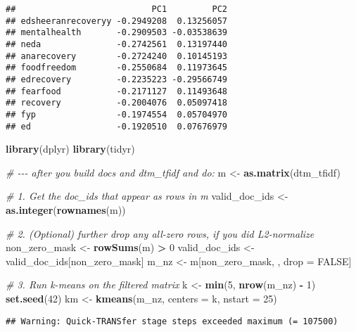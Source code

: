 \documentclass[
]{article}
\newenvironment{Shaded}{\begin{snugshade}}{\end{snugshade}}
\newcommand{\AttributeTok}[1]{\textcolor[rgb]{0.13,0.29,0.53}{#1}}
\newcommand{\CommentTok}[1]{\textcolor[rgb]{0.56,0.35,0.01}{\textit{#1}}}
\newcommand{\ConstantTok}[1]{\textcolor[rgb]{0.56,0.35,0.01}{#1}}
\newcommand{\DecValTok}[1]{\textcolor[rgb]{0.00,0.00,0.81}{#1}}
\newcommand{\FunctionTok}[1]{\textcolor[rgb]{0.13,0.29,0.53}{\textbf{#1}}}
\newcommand{\NormalTok}[1]{#1}
\newcommand{\OtherTok}[1]{\textcolor[rgb]{0.56,0.35,0.01}{#1}}
\newcommand{\SpecialCharTok}[1]{\textcolor[rgb]{0.81,0.36,0.00}{\textbf{#1}}}
\begin{document}
\begin{verbatim}
##                           PC1         PC2
## edsheeranrecoveryy -0.2949208  0.13256057
## mentalhealth       -0.2909503 -0.03538639
## neda               -0.2742561  0.13197440
## anarecovery        -0.2724240  0.10145193
## foodfreedom        -0.2550684  0.11973645
## edrecovery         -0.2235223 -0.29566749
## fearfood           -0.2171127  0.11493648
## recovery           -0.2004076  0.05097418
## fyp                -0.1974554  0.05704970
## ed                 -0.1920510  0.07676979
\end{verbatim}

\begin{Shaded}
\begin{Highlighting}[]
\FunctionTok{library}\NormalTok{(dplyr)}
\FunctionTok{library}\NormalTok{(tidyr)}

\CommentTok{\# {-}{-}{-} after you build \textasciigrave{}docs\textasciigrave{} and \textasciigrave{}dtm\_tfidf\textasciigrave{} and do:}
\NormalTok{m }\OtherTok{\textless{}{-}} \FunctionTok{as.matrix}\NormalTok{(dtm\_tfidf)}

\CommentTok{\# 1. Get the doc\_ids that appear as rows in m}
\NormalTok{valid\_doc\_ids }\OtherTok{\textless{}{-}} \FunctionTok{as.integer}\NormalTok{(}\FunctionTok{rownames}\NormalTok{(m))}

\CommentTok{\# 2. (Optional) further drop any all{-}zero rows, if you did L2{-}normalize}
\NormalTok{non\_zero\_mask   }\OtherTok{\textless{}{-}} \FunctionTok{rowSums}\NormalTok{(m) }\SpecialCharTok{\textgreater{}} \DecValTok{0}
\NormalTok{valid\_doc\_ids   }\OtherTok{\textless{}{-}}\NormalTok{ valid\_doc\_ids[non\_zero\_mask]}
\NormalTok{m\_nz            }\OtherTok{\textless{}{-}}\NormalTok{ m[non\_zero\_mask, , drop }\OtherTok{=} \ConstantTok{FALSE}\NormalTok{]}

\CommentTok{\# 3. Run k{-}means on the filtered matrix}
\NormalTok{k }\OtherTok{\textless{}{-}} \FunctionTok{min}\NormalTok{(}\DecValTok{5}\NormalTok{, }\FunctionTok{nrow}\NormalTok{(m\_nz) }\SpecialCharTok{{-}} \DecValTok{1}\NormalTok{)}
\FunctionTok{set.seed}\NormalTok{(}\DecValTok{42}\NormalTok{)}
\NormalTok{km }\OtherTok{\textless{}{-}} \FunctionTok{kmeans}\NormalTok{(m\_nz, }\AttributeTok{centers =}\NormalTok{ k, }\AttributeTok{nstart =} \DecValTok{25}\NormalTok{)}
\end{Highlighting}
\end{Shaded}

\begin{verbatim}
## Warning: Quick-TRANSfer stage steps exceeded maximum (= 107500)
\end{verbatim}
\end{document}
